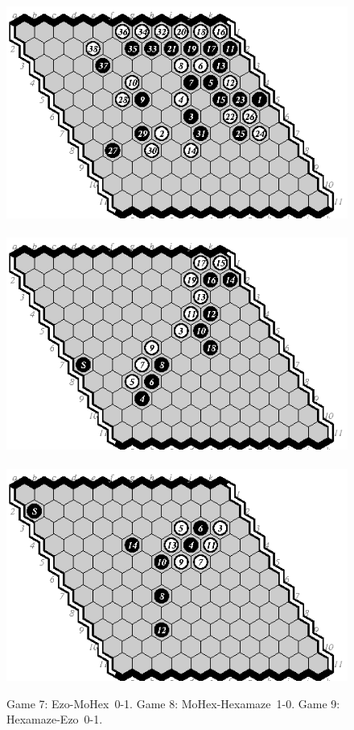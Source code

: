 \documentclass{icga}
\def\Eo{\mbox{\sc Ezo}}
\def\Hz{\mbox{\sc Hexamaze}}
\def\Mx{\mbox{\sc MoHex}}
\begin{document}
\begin{figure}[hbp]
\hspace*{-2cm}\
\includegraphics[scale=1.2]{games/pix/07-em-0-1.eps}\hspace*{-2cm}\
\includegraphics[scale=1.2]{games/pix/08-mh-1-0.eps}\hspace*{-2cm}\
\includegraphics[scale=1.2]{games/pix/09-he-0-1.eps}
\caption{Game 7: \Eo-\Mx\ 0-1. Game 8: \Mx-\Hz\ 1-0. Game 9: \Hz-\Eo\ 0-1.}
\end{figure}
\end{document}
